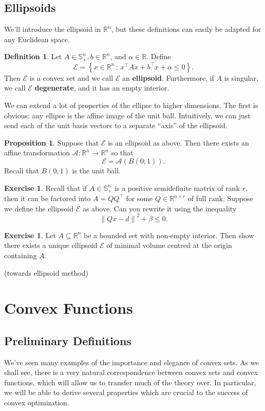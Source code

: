 \documentclass[11pt]{article}
\numberwithin{equation}{section}
\theoremstyle{definition}
\newtheorem{exercise}[theorem]{Exercise}
\newtheorem{proposition}[theorem]{Proposition}
\newtheorem{definition}[theorem]{Definition}%
\newcommand{\bR}{\mathbb{R}}
\newcommand{\bS}{\mathbb{S}}
\newcommand{\cA}{\mathcal{A}}
\newcommand{\cE}{\mathcal{E}}
\newcommand{\norm}[1]{\left\lVert#1\right\rVert}
\newcommand{\set}[2]{\left\{#1\,:\,#2\right\}}
\begin{document}
\subsection{Ellipsoids}
We'll introduce the ellipsoid in $\bR^n$, but these definitions can easily be adapted for any Euclidean space.
\begin{definition}
    Let $A\in\bS_+^n, b\in\bR^n$, and $\alpha\in\bR$. Define
    \begin{equation}
        \cE=\set{x\in\bR^n}{x^\top Ax+b^\top x+\alpha\le 0}.
    \end{equation}
    Then $\cE$ is a convex set and we call $\cE$ an \textbf{ellipsoid}. Furthermore, if $A$ is singular, we call $\cE$ \textbf{degenerate}, and it has an empty interior.
\end{definition}
We can extend a lot of properties of the ellipse to higher dimensions. The first is obvious: any ellipse is the affine image of the unit ball. Intuitively, we can just send each of the unit basis vectors to a separate ``axis'' of the ellipsoid.
\begin{proposition}
    Suppose that $\cE$ is an ellipsoid as above. Then there exists an affine transformation $\cA:\bR^n\to\bR^n$ so that
    \begin{equation}
        \cE=\cA(B(0;1)).
    \end{equation}
    Recall that $B(0;1)$ is the unit ball.
\end{proposition}
\begin{exercise}
    Recall that if $A\in\bS_+^n$ is a positive semidefinite matrix of rank $r$, then it can be factored into $A=QQ^\top$ for some $Q\in\bR^{n\times r}$ of full rank. Suppose we define the ellipsoid $\cE$ as above. Can you rewrite it using the inequality
    \begin{equation}
        \norm{Qx-d}^2+\beta\le 0.
    \end{equation}
\end{exercise}
\begin{exercise}
    Let $A\subseteq\bR^n$ be a bounded set with non-empty interior. Then show there exists a unique ellipsoid $\cE$ of minimal volume centred at the origin containing $A$.
\end{exercise}
(towards ellipsoid method)
\section{Convex Functions}
\subsection{Preliminary Definitions}
We've seen many examples of the importance and elegance of convex sets. As we shall see, there is a very natural correspondence between convex sets and convex functions, which will allow us to transfer much of the theory over. In particular, we will be able to derive several properties which are crucial to the success of convex optimization.
\end{document}
